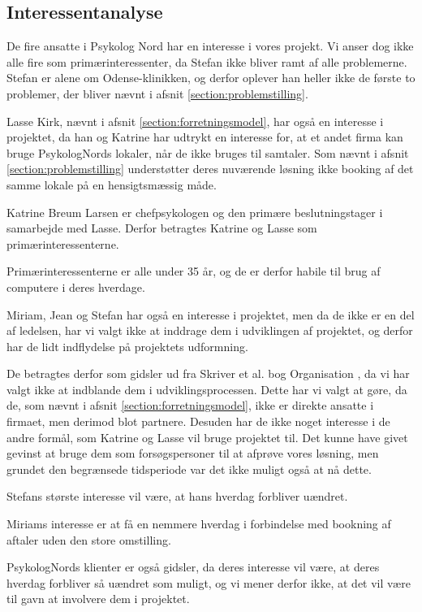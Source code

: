 \subsection{Interessentanalyse}

De fire ansatte i Psykolog Nord har en interesse i vores projekt. Vi anser dog ikke alle fire som primærinteressenter, da Stefan ikke bliver ramt af alle problemerne.
Stefan er alene om Odense-klinikken, og derfor oplever han heller ikke de første to problemer, der bliver nævnt i afsnit \ref{section:problemstilling}.

Lasse Kirk, nævnt i afsnit \ref{section:forretningsmodel}, har også en interesse i projektet, da han og Katrine har udtrykt en interesse for, at et andet firma kan bruge PsykologNords lokaler, når de ikke bruges til samtaler.
Som nævnt i afsnit \ref{section:problemstilling} understøtter deres nuværende løsning ikke booking af det samme lokale på en hensigtsmæssig måde.

Katrine Breum Larsen er chefpsykologen og den primære beslutningstager i samarbejde med Lasse.
Derfor betragtes Katrine og Lasse som primærinteressenterne.

Primærinteressenterne er alle under 35 år, og de er derfor habile til brug af computere i deres hverdage.

Miriam, Jean og Stefan har også en interesse i projektet, men da de ikke er en del af ledelsen, har vi valgt ikke at inddrage dem i udviklingen af projektet, og derfor har de lidt indflydelse på projektets udformning.

De betragtes derfor som gidsler ud fra Skriver et al. bog Organisation \cite[s. 435]{interessentanalyse}, da vi har valgt ikke at indblande dem i udviklingsprocessen.
Dette har vi valgt at gøre, da de, som nævnt i afsnit \ref{section:forretningsmodel}, ikke er direkte ansatte i firmaet, men derimod blot partnere.
Desuden har de ikke noget interesse i de andre formål, som Katrine og Lasse vil bruge projektet til. 
Det kunne have givet gevinst at bruge dem som forsøgspersoner til at afprøve vores løsning, men grundet den begrænsede tidsperiode var det ikke muligt også at nå dette.

Stefans største interesse vil være, at hans hverdag forbliver uændret.

Miriams interesse er at få en nemmere hverdag i forbindelse med bookning af aftaler uden den store omstilling.

PsykologNords klienter er også gidsler, da deres interesse vil være, at deres hverdag forbliver så uændret som muligt, og vi mener derfor ikke, at det vil være til gavn at involvere dem i projektet.